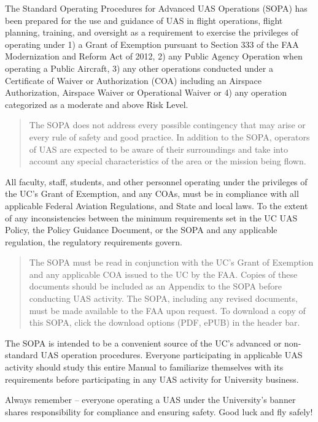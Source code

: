 \documentclass[
]{book}
\begin{document}
The Standard Operating Procedures for Advanced UAS Operations (SOPA) has been prepared for the use and guidance of UAS in flight operations, flight planning, training, and oversight as a requirement to exercise the privileges of operating under 1) a Grant of Exemption pursuant to Section 333 of the FAA Modernization and Reform Act of 2012, 2) any Public Agency Operation when operating a Public Aircraft, 3) any other operations conducted under a Certificate of Waiver or Authorization (COA) including an Airspace Authorization, Airspace Waiver or Operational Waiver or 4) any operation categorized as a moderate and above Risk Level.

\begin{quote}
The SOPA does not address every possible contingency that may arise or every rule of safety and good practice. In addition to the SOPA, operators of UAS are expected to be aware of their surroundings and take into account any special characteristics of the area or the mission being flown.
\end{quote}

All faculty, staff, students, and other personnel operating under the privileges of the UC's Grant of Exemption, and any COAs, must be in compliance with all applicable Federal Aviation Regulations, and State and local laws. To the extent of any inconsistencies between the minimum requirements set in the UC UAS Policy, the Policy Guidance Document, or the SOPA and any applicable regulation, the regulatory requirements govern.

\begin{quote}
The SOPA must be read in conjunction with the UC's Grant of Exemption and any applicable COA issued to the UC by the FAA. Copies of these documents should be included as an Appendix to the SOPA before conducting UAS activity. The SOPA, including any revised documents, must be made available to the FAA upon request. To download a copy of this SOPA, click the download options (PDF, ePUB) in the header bar.
\end{quote}

The SOPA is intended to be a convenient source of the UC's advanced or non-standard UAS operation procedures. Everyone participating in applicable UAS activity should study this entire Manual to familiarize themselves with its requirements before participating in any UAS activity for University business.

Always remember -- everyone operating a UAS under the University's banner shares responsibility for compliance and ensuring safety.
Good luck and fly safely!
\end{document}
